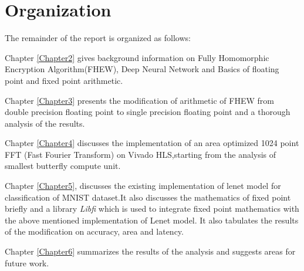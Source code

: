 \section{Organization}

The remainder of the report is organized as follows:

\vspace{0.25cm}
Chapter \ref{Chapter2} gives background information on Fully Homomorphic Encryption Algorithm(FHEW), Deep Neural Network and Basics of floating point and fixed point arithmetic.\par
\vspace{0.25cm}
Chapter \ref{Chapter3} presents the modification of arithmetic of FHEW from double precision floating point to single precision floating point and a thorough analysis of the results.\par
\vspace{0.25cm}
Chapter \ref{Chapter4} discusses the implementation of an area optimized 1024 point FFT (Fast Fourier Transform) on Vivado HLS,starting from the analysis of smallest butterfly compute unit.\par
\vspace{0.25cm}
Chapter \ref{Chapter5}, discusses the existing implementation of lenet model for classification of MNIST dataset.It also discusses the mathematics of fixed point briefly and a library \textit{Libfi} which is used to integrate fixed point mathematics with the above mentioned implementation of Lenet model. It also tabulates the results of the modification on accuracy, area and latency.  \par
\vspace{0.25cm}
Chapter \ref{Chapter6} summarizes the results of the analysis and suggests areas for future work.








